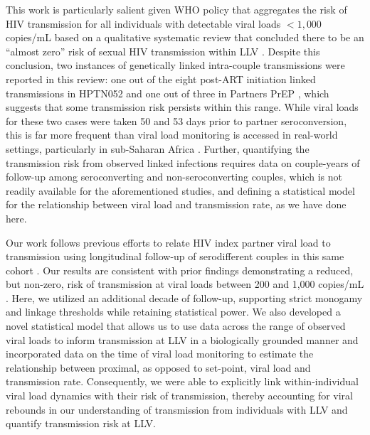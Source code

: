 \documentclass{article}[11pt]
\begin{document}
This work is particularly salient given WHO policy that aggregates the risk of HIV transmission for all individuals with detectable viral loads $<1,000$ copies/mL based on a qualitative systematic review that concluded there to be an ``almost zero'' risk of sexual HIV transmission within LLV \cite{broyles2023}. Despite this conclusion, two instances of genetically linked intra-couple transmissions were reported in this review: one out of the eight post-ART initiation linked transmissions in HPTN052 and one out of three in Partners PrEP \cite{cohen2016, mujugira2016}, which suggests that some transmission risk persists within this range. While viral loads for these two cases were taken 50 and 53 days prior to partner seroconversion, this is far more frequent than viral load monitoring is accessed in real-world settings, particularly in sub-Saharan Africa \cite{kippen2024}. Further, quantifying the transmission risk from observed linked infections requires data on couple-years of follow-up among seroconverting and non-seroconverting couples, which is not readily available for the aforementioned studies, and defining a statistical model for the relationship between viral load and transmission rate, as we have done here. 

Our work follows previous efforts to relate HIV index partner viral load to transmission using longitudinal follow-up of serodifferent couples in this same cohort \cite{fraser2007, quinn2000, blanquart2016}. Our results are consistent with prior findings demonstrating a reduced, but non-zero, risk of transmission at viral loads between 200 and 1,000 copies/mL \cite{blanquart2016}. Here, we utilized an additional decade of follow-up, supporting strict monogamy and linkage thresholds while retaining statistical power. We also developed a novel statistical model that allows us to use data across the range of observed viral loads to inform transmission at LLV in a biologically grounded manner and incorporated data on the time of viral load monitoring to estimate the relationship between proximal, as opposed to set-point, viral load and transmission rate. Consequently, we were able to explicitly link within-individual viral load dynamics with their risk of transmission, thereby accounting for viral rebounds in our understanding of transmission from individuals with LLV and  quantify transmission risk at LLV. 
\end{document}
